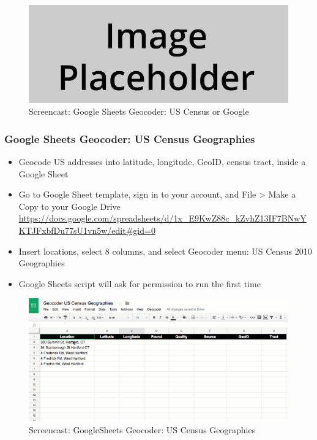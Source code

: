 \documentclass[
  english,
]{book}
\providecommand{\tightlist}{%
  \setlength{\itemsep}{0pt}\setlength{\parskip}{0pt}}
\begin{document}
\begin{figure}
\centering
\includegraphics{images/placeholder.jpg}
\caption{\label{fig:googlesheets-geocoder}Screencast: Google Sheets Geocoder: US Census or Google}
\end{figure}

\hypertarget{google-sheets-geocoder-us-census-geographies}{%
\subsubsection*{Google Sheets Geocoder: US Census Geographies}\label{google-sheets-geocoder-us-census-geographies}}

\begin{itemize}
\tightlist
\item
  Geocode US addresses into latitude, longitude, GeoID, census tract, inside a Google Sheet
\item
  Go to Google Sheet template, sign in to your account, and File \textgreater{} Make a Copy to your Google Drive
  \url{https://docs.google.com/spreadsheets/d/1x_E9KwZ88c_kZvhZ13IF7BNwYKTJFxbfDu77sU1vn5w/edit\#gid=0}
\item
  Insert locations, select 8 columns, and select Geocoder menu: US Census 2010 Geographies
\item
  Google Sheets script will ask for permission to run the first time
\end{itemize}

\begin{figure}
\centering
\includegraphics{images/09-transform/google-sheets-geocoder-census-geographies.gif}
\caption{Screencast: GoogleSheets Geocoder: US Census Geographies}
\end{figure}
\end{document}
